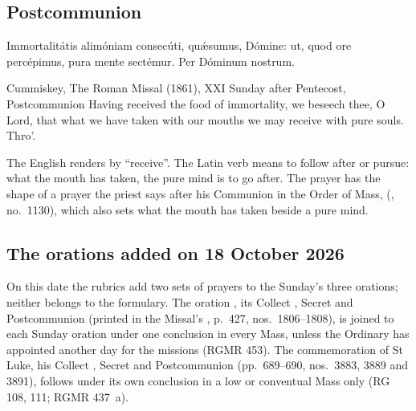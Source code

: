 \subsection{Postcommunion}
\label{proper-postcommunion}


\begin{latinproper}
Immortalitátis alimóniam consecúti, quǽsumus, Dómine: ut, quod ore percépimus,
pura mente sectémur. Per Dóminum nostrum.
\end{latinproper}

\begin{englishwitness}{Cummiskey, The Roman Missal (1861), XXI Sunday after Pentecost, Postcommunion}
Having received the food of immortality, we beseech thee, O Lord, that what we
have taken with our mouths we may receive with pure souls. Thro'.
\end{englishwitness}

\noindent The English renders  by ``receive''. The Latin verb
means to follow after or pursue: what the mouth has taken, the pure mind is to
go after. The prayer has the shape of a prayer the priest says after his
Communion in the Order of Mass,  (,
no.~1130), which also sets what the mouth has taken beside a pure mind.

\subsection{The orations added on 18 October 2026}

On this date the rubrics add two sets of prayers to the Sunday's three orations;
neither belongs to the formulary. The oration , its
Collect , Secret  and Postcommunion  (printed in the Missal's , p.~427,
nos.~1806--1808), is joined to each Sunday oration under one conclusion in every
Mass, unless the Ordinary has appointed another day for the missions (RGMR 453).
The commemoration of St Luke, his Collect ,
Secret  and Postcommunion  (pp.~689--690, nos.~3883, 3889 and 3891), follows
under its own conclusion in a low or conventual Mass only (RG 108, 111;
RGMR 437~a).
